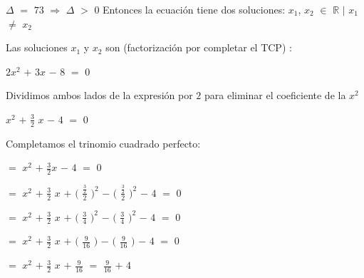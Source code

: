 \documentclass[12pt]{article}
\begin{document}
$\Delta$ $=$ $73$ \hspace{0.3cm} $\Longrightarrow$ \hspace{0.3cm} 
$\Delta$ $>$ $0$ \hspace{0.1cm} Entonces la ecuación tiene dos soluciones: $x_{1}$, $x_{2}$ $\in$ $\mathbb{R}$ $\mid$ $x_{1}$ $\neq$ $x_{2}$ \vspace{0.5cm}
 
Las soluciones $x_{1}$ y $x_{2}$ son (factorización por completar el TCP) : \vspace{0.5cm}
 
\hspace{4cm} $2x^{2}$ $+$ $3x$ $-$ $8$ $=$ $0$ \vspace{0.5cm}
 
Dividimos ambos lados de la expresión por $2$ para eliminar el coeficiente de la $x^{2}$ \vspace{0.5cm}

\hspace{4cm} $x^{2}$ $+$ {\Large{$\frac{3}{2}$}} $x$ $-$ $4$ $=$ $0$ \vspace{0.5cm}

Completamos el trinomio cuadrado perfecto:\vspace{0.5cm}

\hspace{4cm} $=$ $x^{2}$ $+$ {\Large{$\frac{3}{2}$}}$x$ $-$ $4$ $=$ $0$ \vspace{0.5cm}

\hspace{4cm} $=$ $x^{2}$ $+$ {\Large{$\frac{3}{2}$}} $x$ $+$ $\bigg($ {\Large{$\frac{\frac{3}{2}}{2}$}} $\bigg)^{2}$ $-$ $\bigg($ {\Large{$\frac{\frac{3}{2}}{2}$}} $\bigg)^{2}$ $-$ $4$ $=$ $0$ \vspace{0.5cm}

\hspace{4cm} $=$ $x^{2}$ $+$ {\Large{$\frac{3}{2}$}} $x$ $+$ $\bigg($ {\Large{$\frac{3}{4}$}} $\bigg)^{2}$ $-$ $\bigg($ {\Large{$\frac{3}{4}$}} $\bigg)^{2}$ $-$ $4$ $=$ $0$ \vspace{0.5cm}

\hspace{4cm} $=$ $x^{2}$ $+$ {\Large{$\frac{3}{2}$}} $x$ $+$ $\bigg($ {\Large{$\frac{9}{16}$}} $\bigg)$ $-$ $\bigg($ {\Large{$\frac{9}{16}$}} $\bigg)$ $-$ $4$ $=$ $0$ \vspace{0.5cm}

\hspace{4cm} $=$ $x^{2}$ $+$ {\Large{$\frac{3}{2}$}} $x$ $+$  {\Large{$\frac{9}{16}$}}  $=$   {\Large{$\frac{9}{16}$}}  $+$ $4$ \vspace{0.5cm}
\end{document}
